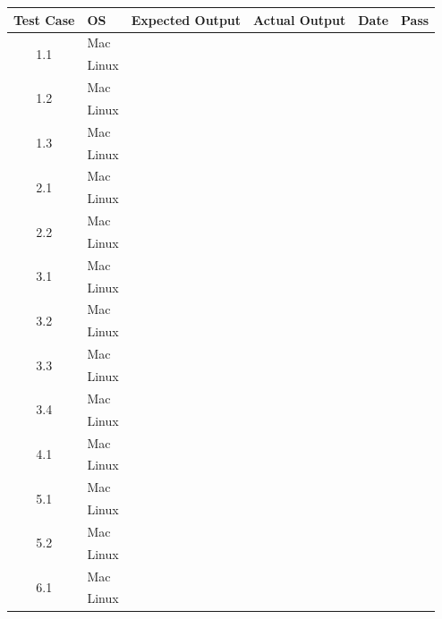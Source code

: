 \documentclass[a4paper, 12pt]{article}
\newcommand{\cmark}{\ding{51}}%
\newcommand{\xmark}{\ding{55}}%
\begin{document}
\begin{tabular}{| c | l | l | l | l | c |}
\hline

Test Case 				& OS			& Expected Output			& Actual Output		& Date			& Pass		\\ \hline
\multirow{2}{*}{1.1}	& Mac		&									&							&					&	\cmark			\\ \cline{2-6}
							& Linux		&									&							&					& \xmark				\\ \hline
\multirow{2}{*}{1.2}	& Mac		&									&							&					&				\\ \cline{2-6}
							& Linux		&									&							&					&				\\ \hline
\multirow{2}{*}{1.3}	& Mac		&									&							&					&				\\ \cline{2-6}
							& Linux		&									&							&					&				\\ \hline
\multirow{2}{*}{2.1}	& Mac		&									&							&					&				\\ \cline{2-6}
							& Linux		&									&							&					&				\\ \hline
\multirow{2}{*}{2.2}	& Mac		&									&							&					&				\\ \cline{2-6}
							& Linux		&									&							&					&				\\ \hline
\multirow{2}{*}{3.1}	& Mac		&									&							&					&				\\ \cline{2-6}
							& Linux		&									&							&					&				\\ \hline
\multirow{2}{*}{3.2}	& Mac		&									&							&					&				\\ \cline{2-6}
							& Linux		&									&							&					&				\\ \hline
\multirow{2}{*}{3.3}	& Mac		&									&							&					&				\\ \cline{2-6}
							& Linux		&									&							&					&				\\ \hline
\multirow{2}{*}{3.4}	& Mac		&									&							&					&				\\ \cline{2-6}
							& Linux		&									&							&					&				\\ \hline
\multirow{2}{*}{4.1}	& Mac		&									&							&					&				\\ \cline{2-6}
							& Linux		&									&							&					&				\\ \hline
\multirow{2}{*}{5.1}	& Mac		&									&							&					&				\\ \cline{2-6}
							& Linux		&									&							&					&				\\ \hline
\multirow{2}{*}{5.2}	& Mac		&									&							&					&				\\ \cline{2-6}
							& Linux		&									&							&					&				\\ \hline
\multirow{2}{*}{6.1}	& Mac		&									&							&					&				\\ \cline{2-6}
							& Linux		&									&							&					&				\\ \hline

\end{tabular}
\newpage
\end{document}
